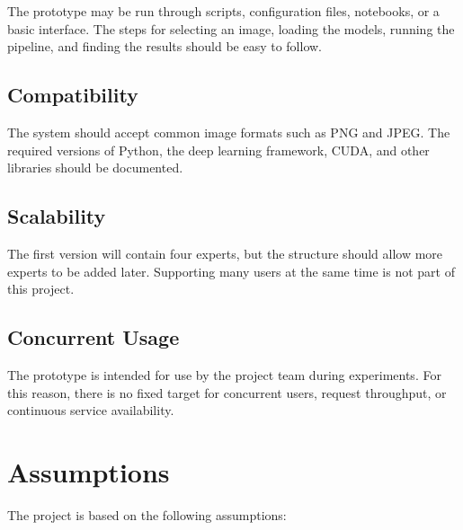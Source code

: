 \documentclass{FastFyp}
\begin{document}
The prototype may be run through scripts, configuration files, notebooks, or a basic interface. The steps for selecting an image, loading the models, running the pipeline, and finding the results should be easy to follow.

\subsection{Compatibility}

The system should accept common image formats such as PNG and JPEG. The required versions of Python, the deep learning framework, CUDA, and other libraries should be documented.

\subsection{Scalability}

The first version will contain four experts, but the structure should allow more experts to be added later. Supporting many users at the same time is not part of this project.

\subsection{Concurrent Usage}

The prototype is intended for use by the project team during experiments. For this reason, there is no fixed target for concurrent users, request throughput, or continuous service availability.

\section{Assumptions}

The project is based on the following assumptions:
\end{document}
